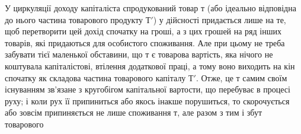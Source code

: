 У циркуляції доходу капіталіста спродукований товар $т$ (або ідеально
відповідна до нього частина товарового продукту $Т'$) у дійсності придається
лише на те, щоб перетворити цей дохід спочатку на гроші, а з цих
грошей на ряд інших товарів, які придаються для особистого споживання.
Але при цьому не треба забувати тієї маленької обставини, що $т$ є товарова
вартість, яка нічого не коштувала капіталістові, втілення додаткової
праці, а тому воно виходить на кін спочатку як складова частина товарового
капіталу $Т'$. Отже, це $т$ самим своїм існуванням зв’язане з кругобігом
капітальної вартости, що перебуває в процесі руху; і коли рух
її припиниться або якось інакше порушиться, то скорочується або зовсім
припиняється не лише споживання $т$, але разом з тим і збут товарового
\parbreak{}  %
